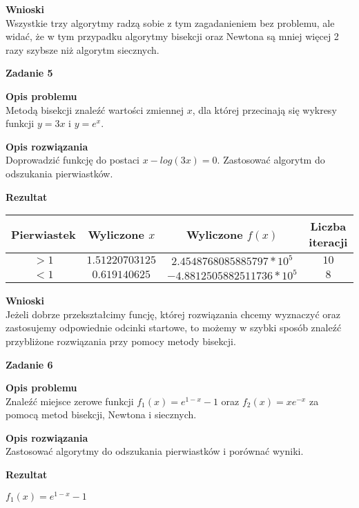 \documentclass{article}
\begin{document}
\noindent \textbf{Wnioski} \\
Wszystkie trzy algorytmy radzą sobie z tym zagadanieniem bez problemu, ale widać, że w tym przypadku
algorytmy bisekcji oraz Newtona są mniej więcej 2 razy szybsze niż algorytm siecznych.

\noindent \textbf{\large Zadanie 5}

\noindent \textbf{Opis problemu} \\
Metodą bisekcji znaleźć wartości zmiennej $x$, dla której przecinają się wykresy funkcji $y = 3x$
i $y = e^x$.

\noindent \textbf{Opis rozwiązania} \\
Doprowadzić funkcję do postaci $x - log(3x) = 0$. Zastosować algorytm do odszukania pierwiastków.

\noindent \textbf{Rezultat}

\begin{center}
	\begin{tabular}{|c|c|c|c|}
		\hline
		\textbf{Pierwiastek} & \textbf{Wyliczone $x$} & \textbf{Wyliczone $f(x)$}    & \textbf{Liczba iteracji} \\
		\hline
		$>1$                 & $1.51220703125$        & $2.4548768085885797*10^{5}$  & $10$                     \\
		\hline
		$<1$                 & $0.619140625$          & $-4.8812505882511736*10^{5}$ & $8$                      \\
		\hline
	\end{tabular}
\end{center}

\noindent \textbf{Wnioski} \\
Jeżeli dobrze przekształcimy funcję, której rozwiązania chcemy wyznaczyć oraz zastosujemy odpowiednie
odcinki startowe, to możemy w szybki sposób znaleźć przybliżone rozwiązania przy pomocy metody bisekcji.

\pagebreak

\noindent \textbf{\large Zadanie 6}

\noindent \textbf{Opis problemu} \\
Znaleźć miejsce zerowe funkcji $f_1(x) = e^{1-x} - 1$ oraz $f_2(x) = xe^{-x}$
za pomocą metod bisekcji, Newtona i siecznych.

\noindent \textbf{Opis rozwiązania} \\
Zastosować algorytmy do odszukania pierwiastków i porównać wyniki.

\noindent \textbf{Rezultat}

\noindent \textbf{$f_1(x) = e^{1-x} - 1$}
\end{document}
